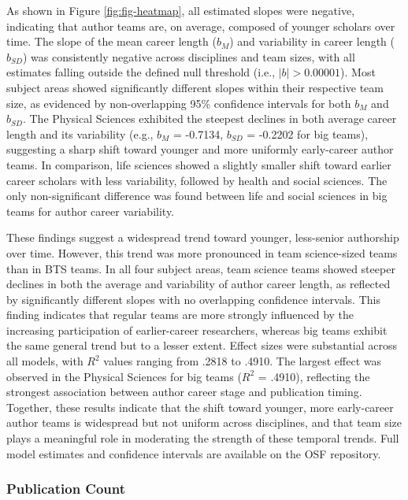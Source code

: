 \documentclass[
  man,floatsintext]{apa7}
\begin{document}
As shown in Figure \ref{fig:fig-heatmap}, all estimated slopes were
negative, indicating that author teams are, on average, composed of
younger scholars over time. The slope of the mean career length (\(b_M\))
and variability in career length (\(b_{SD}\)) was consistently negative
across disciplines and team sizes, with all estimates falling outside
the defined null threshold (i.e., \(|b| > 0.00001\)). Most subject areas
showed significantly different slopes within their respective team size,
as evidenced by non-overlapping 95\% confidence intervals for both \(b_M\)
and \(b_{SD}\). The Physical Sciences exhibited the steepest declines in
both average career length and its variability (e.g., \(b_M\) = -0.7134,
\(b_{SD}\) = -0.2202 for big teams), suggesting a sharp shift toward
younger and more uniformly early-career author teams. In comparison,
life sciences showed a slightly smaller shift toward earlier career
scholars with less variability, followed by health and social sciences.
The only non-significant difference was found between life and social
sciences in big teams for author career variability.

These findings suggest a widespread trend toward younger, less-senior
authorship over time. However, this trend was more pronounced in team
science-sized teams than in BTS teams. In all four subject areas, team
science teams showed steeper declines in both the average and
variability of author career length, as reflected by significantly
different slopes with no overlapping confidence intervals. This finding
indicates that regular teams are more strongly influenced by the
increasing participation of earlier-career researchers, whereas big
teams exhibit the same general trend but to a lesser extent. Effect
sizes were substantial across all models, with \(R^2\) values ranging from
.2818 to .4910. The largest effect was observed in the Physical Sciences
for big teams (\(R^2\) = .4910), reflecting the strongest association
between author career stage and publication timing. Together, these
results indicate that the shift toward younger, more early-career author
teams is widespread but not uniform across disciplines, and that team
size plays a meaningful role in moderating the strength of these
temporal trends. Full model estimates and confidence intervals are
available on the OSF repository.

\subsubsection{Publication Count}\label{publication-count}
\end{document}
